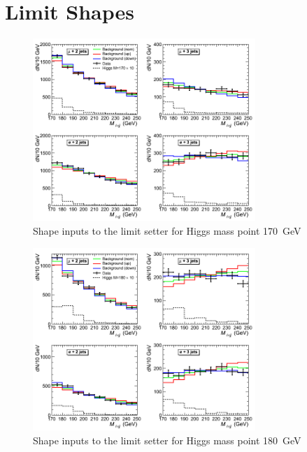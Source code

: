 \section{Limit Shapes}
\label{app:limitShapes}

\begin{figure}[h!]
\begin{center}
\includegraphics[width=0.75\textwidth]{plots/2012_SHAPES/hww-histo-shapes-M=170}
\caption{Shape inputs to the limit setter for Higgs mass point 170~GeV}
\end{center}
\end{figure}
\begin{figure}[h!]
\begin{center}
\includegraphics[width=0.75\textwidth]{plots/2012_SHAPES/hww-histo-shapes-M=180}
\caption{Shape inputs to the limit setter for Higgs mass point 180~GeV}
\end{center}
\end{figure}

